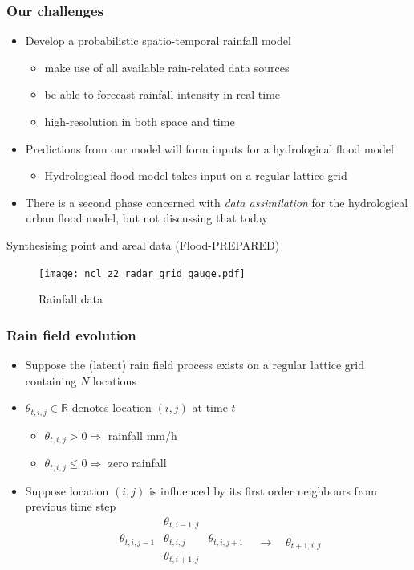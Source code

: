 \begin{frame}[fragile]
\frametitle{Our challenges}
\bigskip
\begin{itemize}
\item  Develop a probabilistic spatio-temporal rainfall model
\medskip
\begin{itemize}
\item make use of all available rain-related data sources
\medskip
\item be able to forecast rainfall intensity in real-time
\medskip
\item high-resolution in both space and time
\end{itemize} 
\bigskip
\item Predictions from our model will form inputs for a hydrological flood model
\medskip
\begin{itemize}
\item Hydrological flood model takes input on a regular lattice grid
\end{itemize}
\bigskip
\item There is a second phase concerned with \emph{data assimilation} for the hydrological urban flood model, but not discussing that today
\end{itemize}
\end{frame}


\begin{frame}{Synthesising point and areal data (Flood-PREPARED)}
\protect\hypertarget{synthesising-point-and-areal-data-flood-prepared}{}

\begin{figure}
\centering
\texttt{[image: ncl\_z2\_radar\_grid\_gauge.pdf]}
\caption{Rainfall data}
\end{figure}

\end{frame}


\begin{frame}
\frametitle{Rain field evolution}
\begin{itemize}
\item Suppose the (latent) rain field process exists on a regular lattice grid containing $N$ locations
\bigskip
\item $\theta_{t,i,j} \in \mathbb{R}$ denotes location $(i,j)$ at time $t$
\begin{itemize}
\medskip
\item $\theta_{t,i,j} > 0 \Longrightarrow$ rainfall mm/h
\medskip
\item $\theta_{t,i,j} \leq 0 \Longrightarrow$ zero rainfall 
\end{itemize}
\bigskip
\item Suppose location $(i,j)$ is influenced by its first order neighbours from previous time step
\medskip
\[
\begin{matrix}
    & \theta_{t,i-1,j} & \\
    \theta_{t,i,j-1} & \theta_{t,i,j} & \theta_{t,i,j+1} & \\
    & \theta_{t,i+1,j} &  \\
\end{matrix} \to \quad \theta_{t+1,i,j}
\]
\end{itemize}
\end{frame}


